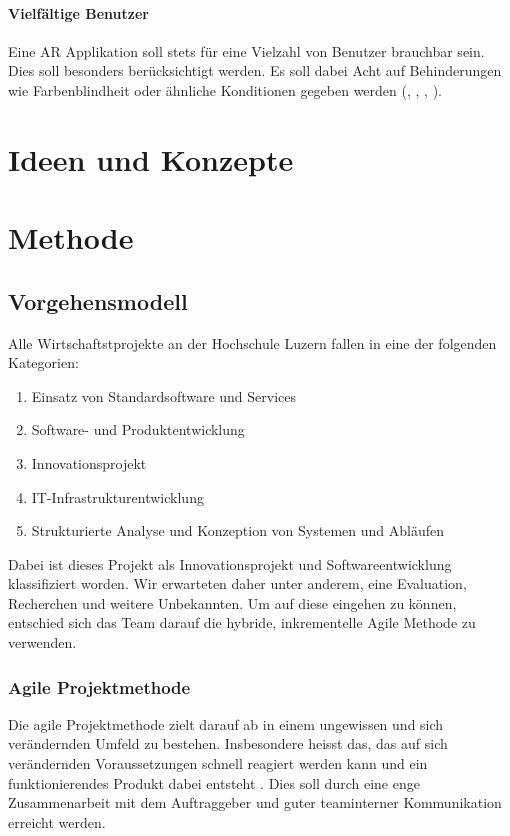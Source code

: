 \documentclass[a4paper]{scrreprt}
\begin{document}
\subsubsection{Vielfältige Benutzer}
Eine AR Applikation soll stets für eine Vielzahl von Benutzer brauchbar sein. Dies soll besonders berücksichtigt werden. Es soll dabei Acht auf Behinderungen wie Farbenblindheit oder ähnliche Konditionen gegeben werden (\cite{AppleGuideline2018}, \cite{GoogleGuideline2018}, \cite{GoogleIO2018}, \cite{BerfinAyhan2017}).

\chapter{Ideen und Konzepte}

\chapter{Methode}

\section{Vorgehensmodell}

Alle Wirtschaftstprojekte an der Hochschule Luzern fallen in eine der folgenden Kategorien:

\begin{enumerate}
	\item Einsatz von Standardsoftware und Services
	\item Software- und Produktentwicklung
	\item Innovationsprojekt
	\item IT-Infrastrukturentwicklung
	\item Strukturierte Analyse und Konzeption von Systemen und Abläufen
\end{enumerate}

Dabei ist dieses Projekt als Innovationsprojekt und Softwareentwicklung klassifiziert worden. Wir erwarteten daher unter anderem, eine Evaluation, Recherchen und weitere Unbekannten. Um auf diese eingehen zu können, entschied sich das Team darauf die hybride, inkrementelle Agile Methode zu verwenden.

\subsection{Agile Projektmethode}

Die agile Projektmethode zielt darauf ab in einem ungewissen und sich verändernden Umfeld zu bestehen. Insbesondere heisst das, das auf sich verändernden Voraussetzungen schnell reagiert werden kann und ein funktionierendes Produkt dabei entsteht \parencite{AgileAlliance2015}. Dies soll durch eine enge Zusammenarbeit mit dem Auftraggeber und guter teaminterner Kommunikation erreicht werden.
\end{document}
